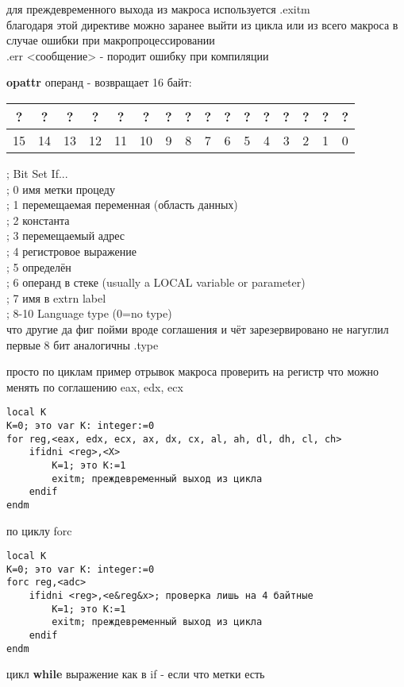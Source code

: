 \documentclass[a4paper,10pt]{article}
\begin{document}
для преждевременного выхода из макроса используется .exitm \\
благодаря этой директиве можно заранее выйти из цикла или из всего макроса в случае ошибки при макропроцессировании \\
.err <сообщение> - породит ошибку при компиляции \par
\noindent
\textbf{opattr} операнд - возвращает 16 байт: \\
\begin{tabular}{|c|c|c|c|c|c|c|c|c|c|c|c|c|c|c|c|}
    \hline
    ? & ? & ? & ? & ? & ? & ? & ? & ? & ? & ? & ? & ? & ? & ? & ?  \\
    \hline
    15 & 14 & 13 & 12 & 11 & 10 & 9 & 8 & 7 & 6 & 5 & 4 & 3 & 2 & 1 & 0 \\
    \hline
\end{tabular}
\newpage
\noindent
;     Bit    Set If... \\
;     0      имя метки процеду \\ 
;     1      перемещаемая переменная (область данных)\\
;     2      константа \\
;     3      перемещаемый адрес \\
;     4      регистровое выражение \\
;     5      определён \\ 
;     6      операнд в стеке (usually a LOCAL variable or parameter) \\
;     7      имя в extrn label \\
;     8-10   Language type (0=no type) \\
что другие да фиг пойми вроде соглашения и чёт зарезервировано не нагуглил\\
первые 8 бит аналогичны .type \par
просто по циклам пример отрывок макроса проверить на регистр что можно менять по соглашению eax, edx, ecx  \\
\begin{verbatim}
local K
K=0; это var K: integer:=0
for reg,<eax, edx, ecx, ax, dx, cx, al, ah, dl, dh, cl, ch>
    ifidni <reg>,<X>
        K=1; это K:=1
        exitm; преждевременный выход из цикла
    endif
endm
\end{verbatim}
по циклу forc
\begin{verbatim}
local K
K=0; это var K: integer:=0
forc reg,<adc>
    ifidni <reg>,<e&reg&x>; проверка лишь на 4 байтные
        K=1; это K:=1
        exitm; преждевременный выход из цикла
    endif
endm
\end{verbatim}
цикл \textbf{while} выражение как в if - если что метки есть\\
\end{document}
